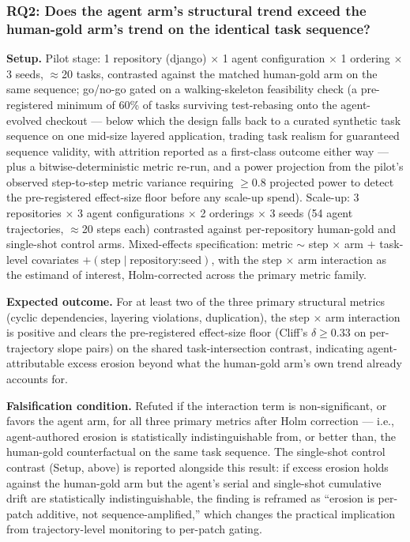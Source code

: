 \documentclass[11pt]{article}
\begin{document}
\subsubsection{RQ2: Does the agent arm's structural trend exceed the human-gold arm's trend on the identical task sequence?}
\textbf{Setup.} Pilot stage: 1 repository (django) $\times$ 1 agent configuration $\times$ 1 ordering $\times$ 3 seeds, $\approx$20 tasks, contrasted against the matched human-gold arm on the same sequence; go/no-go gated on a walking-skeleton feasibility check (a pre-registered minimum of 60\% of tasks surviving test-rebasing onto the agent-evolved checkout --- below which the design falls back to a curated synthetic task sequence on one mid-size layered application, trading task realism for guaranteed sequence validity, with attrition reported as a first-class outcome either way --- plus a bitwise-deterministic metric re-run, and a power projection from the pilot's observed step-to-step metric variance requiring $\geq 0.8$ projected power to detect the pre-registered effect-size floor before any scale-up spend). Scale-up: 3 repositories $\times$ 3 agent configurations $\times$ 2 orderings $\times$ 3 seeds (54 agent trajectories, $\approx$20 steps each) contrasted against per-repository human-gold and single-shot control arms. Mixed-effects specification: metric $\sim$ step $\times$ arm $+$ task-level covariates $+ (\text{step} \mid \text{repository:seed})$, with the step $\times$ arm interaction as the estimand of interest, Holm-corrected across the primary metric family.

\textbf{Expected outcome.} For at least two of the three primary structural metrics (cyclic dependencies, layering violations, duplication), the step $\times$ arm interaction is positive and clears the pre-registered effect-size floor (Cliff's $\delta \geq 0.33$ on per-trajectory slope pairs) on the shared task-intersection contrast, indicating agent-attributable excess erosion beyond what the human-gold arm's own trend already accounts for.

\textbf{Falsification condition.} Refuted if the interaction term is non-significant, or favors the agent arm, for all three primary metrics after Holm correction --- i.e., agent-authored erosion is statistically indistinguishable from, or better than, the human-gold counterfactual on the same task sequence. The single-shot control contrast (Setup, above) is reported alongside this result: if excess erosion holds against the human-gold arm but the agent's serial and single-shot cumulative drift are statistically indistinguishable, the finding is reframed as ``erosion is per-patch additive, not sequence-amplified,'' which changes the practical implication from trajectory-level monitoring to per-patch gating.
\end{document}
